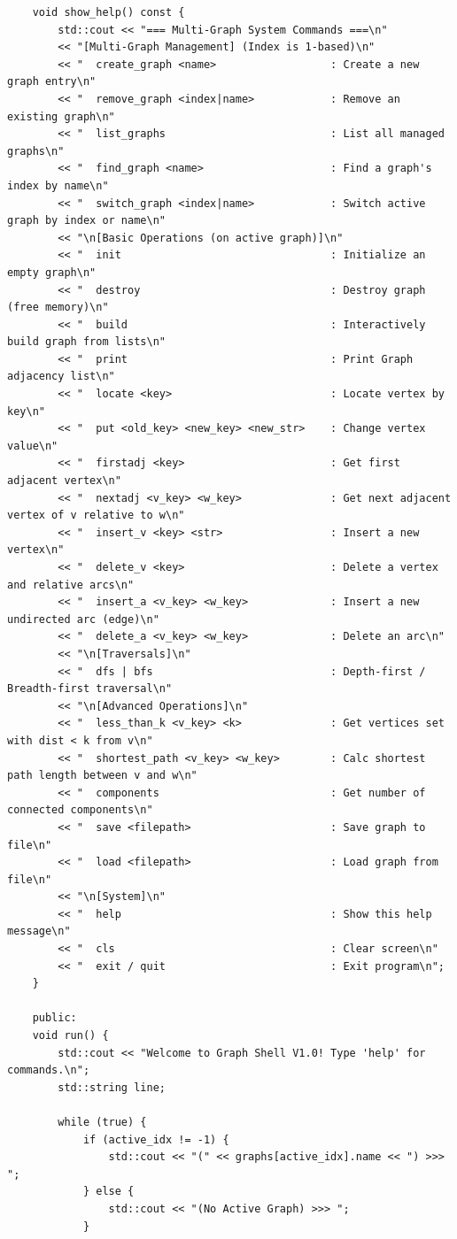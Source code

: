 \documentclass[supercite]{Experimental_Report}
\theoremstyle{definition}
\begin{document}
\begin{lstlisting}
	void show_help() const {
		std::cout << "=== Multi-Graph System Commands ===\n"
		<< "[Multi-Graph Management] (Index is 1-based)\n"
		<< "  create_graph <name>                  : Create a new graph entry\n"
		<< "  remove_graph <index|name>            : Remove an existing graph\n"
		<< "  list_graphs                          : List all managed graphs\n"
		<< "  find_graph <name>                    : Find a graph's index by name\n"
		<< "  switch_graph <index|name>            : Switch active graph by index or name\n"
		<< "\n[Basic Operations (on active graph)]\n"
		<< "  init                                 : Initialize an empty graph\n"
		<< "  destroy                              : Destroy graph (free memory)\n"
		<< "  build                                : Interactively build graph from lists\n"
		<< "  print                                : Print Graph adjacency list\n"
		<< "  locate <key>                         : Locate vertex by key\n"
		<< "  put <old_key> <new_key> <new_str>    : Change vertex value\n"
		<< "  firstadj <key>                       : Get first adjacent vertex\n"
		<< "  nextadj <v_key> <w_key>              : Get next adjacent vertex of v relative to w\n"
		<< "  insert_v <key> <str>                 : Insert a new vertex\n"
		<< "  delete_v <key>                       : Delete a vertex and relative arcs\n"
		<< "  insert_a <v_key> <w_key>             : Insert a new undirected arc (edge)\n"
		<< "  delete_a <v_key> <w_key>             : Delete an arc\n"
		<< "\n[Traversals]\n"
		<< "  dfs | bfs                            : Depth-first / Breadth-first traversal\n"
		<< "\n[Advanced Operations]\n"
		<< "  less_than_k <v_key> <k>              : Get vertices set with dist < k from v\n"
		<< "  shortest_path <v_key> <w_key>        : Calc shortest path length between v and w\n"
		<< "  components                           : Get number of connected components\n"
		<< "  save <filepath>                      : Save graph to file\n"
		<< "  load <filepath>                      : Load graph from file\n"
		<< "\n[System]\n"
		<< "  help                                 : Show this help message\n"
		<< "  cls                                  : Clear screen\n"
		<< "  exit / quit                          : Exit program\n";
	}
	
	public:
	void run() {
		std::cout << "Welcome to Graph Shell V1.0! Type 'help' for commands.\n";
		std::string line;
		
		while (true) {
			if (active_idx != -1) {
				std::cout << "(" << graphs[active_idx].name << ") >>> ";
			} else {
				std::cout << "(No Active Graph) >>> ";
			}
			

\end{lstlisting}
\end{document}
